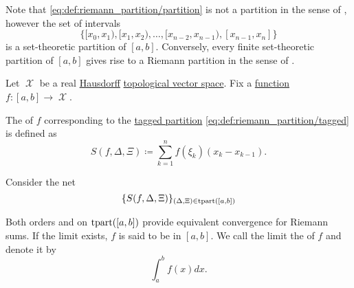 \begin{remark}\label{rem:set_and_riemann_partitions}
  Note that \eqref{eq:def:riemann_partition/partition} is not a partition in the sense of , however the set of intervals
  \begin{equation*}
    \Big\{ [x_0, x_1), [x_1, x_2), \ldots, [x_{n-2}, x_{n-1}), [x_{n-1}, x_n] \Big\}
  \end{equation*}
  is a set-theoretic partition of \( [a, b] \). Conversely, every finite set-theoretic partition of \( [a, b] \) gives rise to a Riemann partition in the sense of .
\end{remark}

\begin{definition}\label{def:riemann_integral}\mcite\cite[def. 2]{Gordon1991}
  Let \( \mscrX \) be a real \hyperref[def:separation_axioms/T2]{Hausdorff} \hyperref[def:topological_vector_space]{topological vector space}. Fix a \hyperref[def:function/single_valued]{function} \( f: [a, b] \to \mscrX \).

  The  of \( f \) corresponding to the \hyperref[def:riemann_partition/tagged]{tagged partition} \eqref{eq:def:riemann_partition/tagged} is defined as
  \begin{equation*}
    S(f, \Delta, \Xi) \coloneqq \sum_{k=1}^n f(\xi_k) (x_k - x_{k-1}).
  \end{equation*}

  Consider the net
  \begin{equation}\label{eq:def:riemann_integral/net}
    \{ S(f, \Delta, \Xi) \}_{(\Delta, \Xi) \in \operatorname{tpart}([a, b])}
  \end{equation}

  Both orders  and  on \( \operatorname{tpart}([a, b]) \) provide equivalent convergence for Riemann sums. If the limit exists, \( f \) is said to be  in \( [a, b] \). We call the limit the  of \( f \) and denote it by
  \begin{equation}\label{eq:def:riemann_integral}
    \int_a^b f(x) dx.
  \end{equation}
\end{definition}

